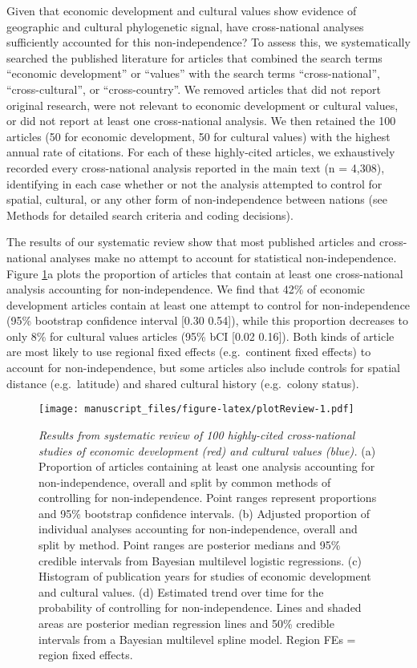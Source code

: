 \documentclass[english,man,floatsintext]{apa6}
\begin{document}
Given that economic development and cultural values show evidence of geographic and cultural phylogenetic signal, have cross-national analyses sufficiently accounted for this non-independence? To assess this, we systematically searched the published literature for articles that combined the search terms \enquote{economic development} or \enquote{values} with the search terms \enquote{cross-national}, \enquote{cross-cultural}, or \enquote{cross-country}. We removed articles that did not report original research, were not relevant to economic development or cultural values, or did not report at least one cross-national analysis. We then retained the 100 articles (50 for economic development, 50 for cultural values) with the highest annual rate of citations. For each of these highly-cited articles, we exhaustively recorded every cross-national analysis reported in the main text (n = 4,308), identifying in each case whether or not the analysis attempted to control for spatial, cultural, or any other form of non-independence between nations (see Methods for detailed search criteria and coding decisions).

The results of our systematic review show that most published articles and cross-national analyses make no attempt to account for statistical non-independence. Figure \ref{fig:plotReview}a plots the proportion of articles that contain at least one cross-national analysis accounting for non-independence. We find that 42\% of economic development articles contain at least one attempt to control for non-independence (95\% bootstrap confidence interval {[}0.30 0.54{]}), while this proportion decreases to only 8\% for cultural values articles (95\% bCI {[}0.02 0.16{]}). Both kinds of article are most likely to use regional fixed effects (e.g.~continent fixed effects) to account for non-independence, but some articles also include controls for spatial distance (e.g.~latitude) and shared cultural history (e.g.~colony status).



\begin{figure}
\centering
\texttt{[image: manuscript\_files/figure-latex/plotReview-1.pdf]}
\caption{\label{fig:plotReview}\emph{Results from systematic review of 100 highly-cited cross-national studies of economic development (red) and cultural values (blue).} (a) Proportion of articles containing at least one analysis accounting for non-independence, overall and split by common methods of controlling for non-independence. Point ranges represent proportions and 95\% bootstrap confidence intervals. (b) Adjusted proportion of individual analyses accounting for non-independence, overall and split by method. Point ranges are posterior medians and 95\% credible intervals from Bayesian multilevel logistic regressions. (c) Histogram of publication years for studies of economic development and cultural values. (d) Estimated trend over time for the probability of controlling for non-independence. Lines and shaded areas are posterior median regression lines and 50\% credible intervals from a Bayesian multilevel spline model. Region FEs = region fixed effects.}
\end{figure}
\end{document}
